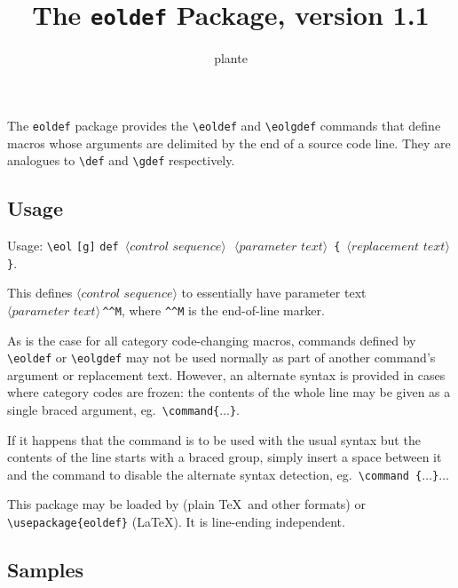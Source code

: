 \documentclass[11pt]{article}
\title{The \texttt{eoldef} Package, version 1.1}
\author{plante}
\begin{document}
\maketitle

The \texttt{eoldef} package provides the \verb|\eoldef| and \verb|\eolgdef| commands that define macros whose arguments are delimited by the end of a source code line. They are analogues to \verb|\def| and \verb|\gdef| respectively.

\subsection*{Usage}

Usage:
	\verb|\eol|%
	{\color{gray}\verb|[|}\verb|g|{\color{gray}\verb|]|}%
	\verb|def|%
	$\,\langle\textit{control sequence}\rangle\,$%
	$\,\langle\textit{parameter text}\rangle\,$%
	\verb|{|%
	$\,\langle\textit{replacement text}\rangle\,$%
	\verb|}|.

This defines $\langle\textit{control sequence}\rangle$ to essentially have parameter text $\langle\textit{parameter text}\rangle\,$\verb|^^M|, where \verb|^^M| is the end-of-line marker.

As is the case for all category code-changing macros, commands defined by \verb|\eoldef| or \verb|\eolgdef| may not be used normally as part of another command's argument or replacement text.
However, an alternate syntax is provided in cases where category codes are frozen: the contents of the whole line may be given as a single braced argument, eg.\ \verb|\command{|$\ldots$\verb|}|.

If it happens that the command is to be used with the usual syntax but the contents of the line starts with a braced group, simply insert a space between it and the command to disable the alternate syntax detection, eg.\ \verb*|\command {|$\ldots$\verb|}|$\ldots$

This package may be loaded by \verb|| (plain \TeX\ and other formats) or \verb|\usepackage{eoldef}| (\LaTeX). It is line-ending independent.

\newpage
\subsection*{Samples}
\end{document}
